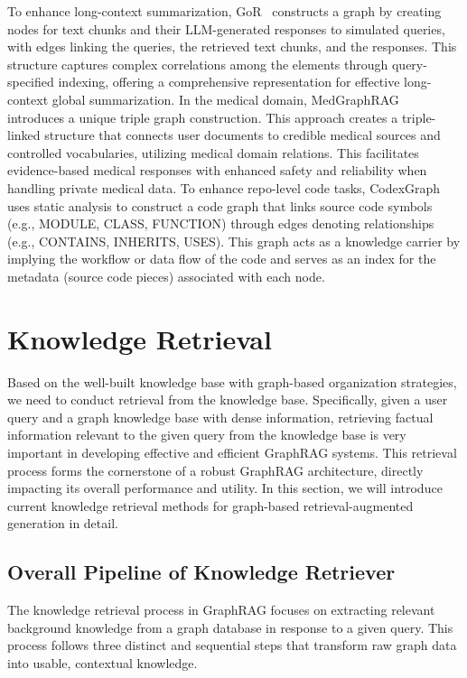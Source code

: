 \documentclass[lettersize,journal]{IEEEtran}
\begin{document}
To enhance long-context summarization, GoR~\cite{zhang2024graphofrecords} constructs a graph by creating nodes for text chunks and their LLM-generated responses to simulated queries, with edges linking the queries, the retrieved text chunks, and the responses. This structure captures complex correlations among the elements through query-specified indexing, offering a comprehensive representation for effective long-context global summarization.
In the medical domain, MedGraphRAG~\cite{wu2024medical} introduces a unique triple graph construction. This approach creates a triple-linked structure that connects user documents to credible medical sources and controlled vocabularies, utilizing medical domain relations. This facilitates evidence-based medical responses with enhanced safety and reliability when handling private medical data.
To enhance repo-level code tasks, CodexGraph~\cite{liu2024codexgraph} uses static analysis to construct a code graph that links source code symbols (e.g., MODULE, CLASS, FUNCTION) through edges denoting relationships (e.g., CONTAINS, INHERITS, USES). This graph acts as a knowledge carrier by implying the workflow or data flow of the code and serves as an index for the metadata (source code pieces) associated with each node.

\section{Knowledge Retrieval} \label{sec:retrieval}

Based on the well-built knowledge base with graph-based organization strategies, we need to conduct retrieval from the knowledge base. Specifically, given a user query and a graph knowledge base with dense information, retrieving factual information relevant to the given query from the knowledge base is very important in developing effective and efficient GraphRAG systems. This retrieval process forms the cornerstone of a robust GraphRAG architecture, directly impacting its overall performance and utility. 
In this section, we will introduce current knowledge retrieval methods for graph-based retrieval-augmented generation in detail.


\subsection{Overall Pipeline of Knowledge Retriever}

The knowledge retrieval process in GraphRAG focuses on extracting relevant background knowledge from a graph database in response to a given query. This process follows three distinct and sequential steps that transform raw graph data into usable, contextual knowledge.
\end{document}
